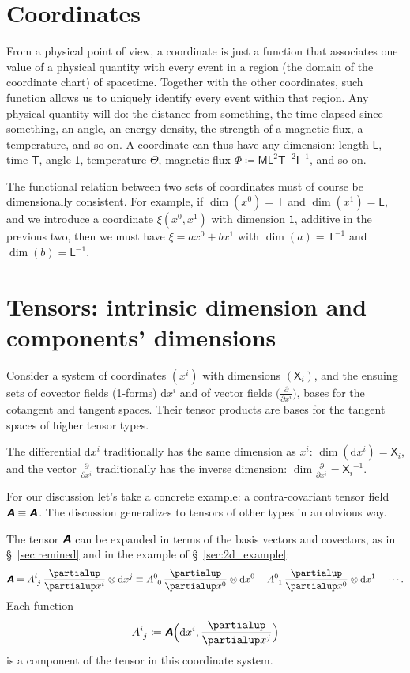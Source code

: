 \documentclass[\ifafour a4paper,12pt,\else a5paper,10pt,\fi%
onecolumn,oneside,article,%
british%
]{memoir}
\makeatletter
\theoremstyle{remark}
\theoremstyle{innote}
\newcommand*{\mathte}[1]{\textbf{\textit{\textsf{#1}}}}
\newcommand*{\de}{\partialup}%
\newcommand*{\di}{\mathrm{d}}%
\newcommand*{\defd}{\coloneqq}
\renewcommand*{\|}[1][]{\nonscript\,#1\vert\nonscript\;\mathopen{}}
\newcommand*{\sect}{\S}%
\newcommand*{\q}{}%
\DeclareRobustCommand*{\q}{%
  \mathbin{\mathpalette\bigcdot@{}}%
}
\newcommand*{\bigcdot@scalefactor}{0.75}
\newcommand*{\bigcdot@widthfactor}{1.5}
\newcommand*{\bigcdot@}[2]{%
  \sbox0{$#1\vcenter{}$}%
  \sbox2{$#1\cdot\m@th$}%
  \hbox to \bigcdot@widthfactor\wd2{%
    \hfil
    \raise\ht0\hbox{%
      \scalebox{\bigcdot@scalefactor}{%
        \lower\ht0\hbox{$#1\bullet\m@th$}%
      }%
    }%
    \hfil
  }%
}
\newcommand*{\Un}{\textsf{1}}
\newcommand*{\Le}{\textsf{L}}
\newcommand*{\Ti}{\textsf{T}}
\newcommand*{\Ma}{\textsf{M}}
\newcommand*{\Te}{\Theta}
\newcommand*{\Cu}{\textsf{I}}
\newcommand*{\Fl}{\Phi}
\newcommand*{\Xx}{\textsf{X}}
\newcommand*{\yA}{\mathte{A}}
\renewcommand*{\i}{\indices}
\newcommand*{\dex}[1][i]{\frac{\de}{\de x^{#1}}}
\newcommand*{\dix}[1][i]{\di x^{#1}}
\makeatother
\begin{document}
\section{Coordinates}
\label{sec:coords}

From a physical point of view, a coordinate is just a function that
associates one value of a physical quantity with every event in a region
(the domain of the coordinate chart) of spacetime. Together with the other
coordinates, such function allows us to uniquely identify every event
within that region. Any physical quantity will do: the distance from
something, the time elapsed since something, an angle, an energy density,
the strength of a magnetic flux, a temperature, and so on. A coordinate can
thus have any dimension: length $\Le$, time $\Ti$, angle $\Un$, temperature
$\Te$, magnetic flux $\Fl \defd \Ma\Le^{2}\Ti^{-2}\Cu^{-1}$, and so on.

The functional relation between two sets of coordinates must of course be
dimensionally consistent. For example, if $\dim(x^{0})=\Ti$ and
$\dim(x^{1})=\Le$, and we introduce a coordinate $\xi(x^{0},x^{1})$ with
dimension $\Un$, additive in the previous two, then we must have
$\xi = a x^{0} + b x^{1}$ with $\dim(a) = \Ti^{-1}$ and
$\dim(b) = \Le^{-1}$.


\section{Tensors: intrinsic dimension and components' dimensions}
\label{sec:tensors}

Consider a system of coordinates $(x^i)$ with dimensions $(\Xx_i)$, and the
ensuing sets of covector fields (1-forms) $\dix$ and of vector fields
$\bigl(\dex\bigr)$, bases for the cotangent and tangent spaces. Their
tensor products are bases for the tangent spaces of higher tensor types.

The differential $\dix$ traditionally has the same dimension as $x^{i}$:
$\dim(\dix) = \Xx_{i}$, and the vector $\dex$ traditionally has the
inverse dimension: $\dim\dex = {\Xx_{i}}^{-1}$. %

For our discussion let's take a concrete example: a contra-covariant tensor
field $\yA \equiv \yA\i{^{\q}_{\q}}$. The discussion generalizes to tensors
of other types in an obvious way.

The tensor $\yA$ can be expanded in terms of the basis vectors and
covectors, as in \sect~\ref{sec:remined} and in the example of
\sect~\ref{sec:2d_example}:
\begin{equation}
  \label{eq:expansion_tensor}
  \yA = A\i{^{i}_{j}}\, \dex\otimes\dix[j]
  \equiv A\i{^{0}_{0}}\,\dex[0]\otimes\dix[0] + 
  A\i{^{0}_{1}}\,\dex[0]\otimes\dix[1] + \dotsb {}.
\end{equation}
Each function
\begin{equation}
  A\i{^{i}_{j}} \defd  \yA\Bigl(\dix, \dex[j]\Bigr)
  \label{eq:components_def}
\end{equation}
is a component of the tensor in this coordinate system.
\end{document}
